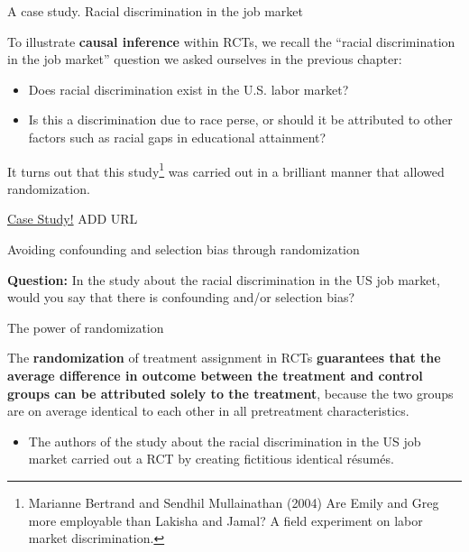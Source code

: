 \documentclass[aspectratio=169]{beamer}
\begin{document}
\begin{frame}{A case study. Racial discrimination in the job market}

To illustrate \textbf{causal inference} within RCTs, we recall the ``racial discrimination in the job market'' question we asked ourselves in the previous chapter:
\vspace{0.2cm}

\begin{itemize}
    \item Does racial discrimination exist in the U.S. labor market?
    \item Is this a discrimination due to race perse, or should it be attributed to other factors such as racial gaps in educational attainment?
\end{itemize}
\vspace{0.3cm}

It turns out that this study\footnote{\scriptsize Marianne Bertrand and Sendhil Mullainathan (2004) Are Emily and Greg more employable than Lakisha and Jamal? A field experiment on labor market discrimination.} was carried out in a brilliant manner that allowed randomization.
\vspace{0.5cm}

\begin{center}
    \Large \href{url}{Case Study!} ADD URL
\end{center}

\end{frame}

\begin{frame}{Avoiding confounding and selection bias through randomization}

    \textbf{Question:} In the study about the racial discrimination in the US job market, would you say that there is confounding and/or selection bias?     
    
\end{frame}

\begin{frame}{The power of randomization}

    The \textbf{randomization} of treatment assignment in RCTs \textbf{guarantees that the average difference in outcome between the treatment and control groups can be attributed solely to the treatment}, because the two groups are on average identical to each other in all pretreatment characteristics.
    \vspace{0.4cm}
    
    \begin{itemize}
        \item The authors of the study about the racial discrimination in the US job market carried out a RCT by creating fictitious identical résumés.

    \end{itemize} 
    
\end{frame}
\end{document}

